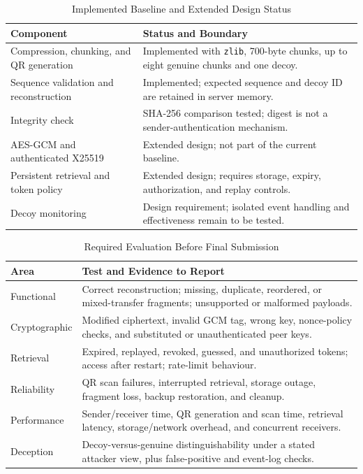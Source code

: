 \documentclass[conference]{IEEEtran}
\begin{document}
\begin{table}[t]
\caption{Implemented Baseline and Extended Design Status}
\label{tab:status}
\centering
\begin{tabular}{>{\raggedright\arraybackslash}p{} >{\raggedright\arraybackslash}p{}}
\toprule
\textbf{Component} & \textbf{Status and Boundary} \\
\midrule
Compression, chunking, and QR generation & Implemented with \texttt{zlib}, 700-byte chunks, up to eight genuine chunks and one decoy. \\
\addlinespace[3pt]
Sequence validation and reconstruction & Implemented; expected sequence and decoy ID are retained in server memory. \\
\addlinespace[3pt]
Integrity check & SHA-256 comparison tested; digest is not a sender-authentication mechanism. \\
\addlinespace[3pt]
AES-GCM and authenticated X25519 & Extended design; not part of the current baseline. \\
\addlinespace[3pt]
Persistent retrieval and token policy & Extended design; requires storage, expiry, authorization, and replay controls. \\
\addlinespace[3pt]
Decoy monitoring & Design requirement; isolated event handling and effectiveness remain to be tested. \\
\bottomrule
\end{tabular}
\end{table}

\begin{table}[t]
\caption{Required Evaluation Before Final Submission}
\label{tab:eval}
\centering
\begin{tabular}{>{\raggedright\arraybackslash}p{} >{\raggedright\arraybackslash}p{}}
\toprule
\textbf{Area} & \textbf{Test and Evidence to Report} \\
\midrule
Functional & Correct reconstruction; missing, duplicate, reordered, or mixed-transfer fragments; unsupported or malformed payloads. \\
\addlinespace[3pt]
Cryptographic & Modified ciphertext, invalid GCM tag, wrong key, nonce-policy checks, and substituted or unauthenticated peer keys. \\
\addlinespace[3pt]
Retrieval & Expired, replayed, revoked, guessed, and unauthorized tokens; access after restart; rate-limit behaviour. \\
\addlinespace[3pt]
Reliability & QR scan failures, interrupted retrieval, storage outage, fragment loss, backup restoration, and cleanup. \\
\addlinespace[3pt]
Performance & Sender/receiver time, QR generation and scan time, retrieval latency, storage/network overhead, and concurrent receivers. \\
\addlinespace[3pt]
Deception & Decoy-versus-genuine distinguishability under a stated attacker view, plus false-positive and event-log checks. \\
\bottomrule
\end{tabular}
\end{table}
\end{document}
